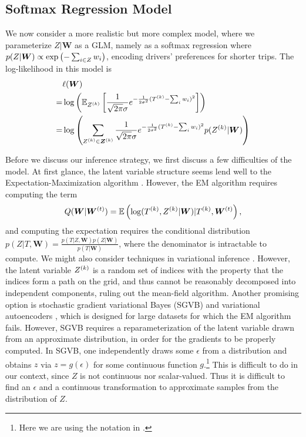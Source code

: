 \documentclass{article}
\begin{document}
 
\subsection{Softmax Regression Model}
\label{sec:softmax}
We now consider a more realistic but more complex model, where we parameterize $Z|\bm W$ as a GLM, namely as a softmax regression where $p(Z|\bm W) \propto \exp\left({-\sum_{i\in Z}w_i}\right)$, encoding drivers' preferences for shorter trips. The log-likelihood in this model is \begin{align*}
& \ell(\bm W) \\
=& \log\left({\mathbb{E}_{Z^{(k)}}\left[{\frac{1}{\sqrt{2\pi}\sigma} e^{-\frac{1}{2\sigma^2}(T^{(k)} - \sum_i w_i)^2}}\right]}\right)\\
=& \log\left({\sum_{Z^{(k)}\in \bm Z^{(k)}} \frac{1}{\sqrt{2\pi}\sigma} e^{-\frac{1}{2\sigma^2}(T^{(k)} - \sum_i w_i)^2} p(Z^{(k)}|\bm W)}\right)
\end{align*}

Before we discuss our inference strategy, we first discuss a few difficulties of the model. At first glance, the latent variable structure seems lend well to the Expectation-Maximization algorithm \cite{dempster1977maximum}. However, the EM algorithm requires computing the term \[
Q(\bm W|\bm W^{(t)}) = \mathbb{E}\left({\log(T^{(k)}, Z^{(k)} | \bm W) | T^{(k)}, \bm W^{(t)}}\right),
\]
and computing the expectation requires the conditional distribution $p(Z | T, \bm W) = \frac{p(T|Z,\bm W)p(Z|\bm W)}{p(T|\bm W)}$, where the denominator is intractable to compute. We might also consider techniques in variational inference \cite{blei2017variational}. However, the latent variable $Z^{(k)}$ is a random set of indices with the property that the indices form a path on the grid, and thus cannot be reasonably decomposed into independent components, ruling out the mean-field algorithm. Another promising option is stochastic gradient variational Bayes (SGVB) and variational autoencoders \cite{kingma2013auto}, which is designed for large datasets for which the EM algorithm fails. However, SGVB requires a reparameterization of the latent variable drawn from an approximate distribution, in order for the gradients to be properly computed. In SGVB, one independently draws some $\epsilon$ from a distribution and obtains $z$ via $z = g(\epsilon)$ for some continuous function $g$.\footnote{Here we are using the notation in \cite{kingma2013auto}.} This is difficult to do in our context, since $Z$ is not continuous nor scalar-valued. Thus it is difficult to find an $\epsilon$ and a continuous transformation to approximate samples from the distribution of $Z$.  
\end{document}

